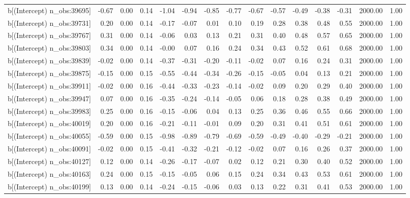 \begin{table}[ht]
\begin{tabular}{rrrrrrrrrrrrrrr}
  b[(Intercept) n\_obs:39695] & -0.67 & 0.00 & 0.14 & -1.04 & -0.94 & -0.85 & -0.77 & -0.67 & -0.57 & -0.49 & -0.38 & -0.31 & 2000.00 & 1.00 \\ 
  b[(Intercept) n\_obs:39731] & 0.20 & 0.00 & 0.14 & -0.17 & -0.07 & 0.01 & 0.10 & 0.19 & 0.28 & 0.38 & 0.48 & 0.55 & 2000.00 & 1.00 \\ 
  b[(Intercept) n\_obs:39767] & 0.31 & 0.00 & 0.14 & -0.06 & 0.03 & 0.13 & 0.21 & 0.31 & 0.40 & 0.48 & 0.57 & 0.65 & 2000.00 & 1.00 \\ 
  b[(Intercept) n\_obs:39803] & 0.34 & 0.00 & 0.14 & -0.00 & 0.07 & 0.16 & 0.24 & 0.34 & 0.43 & 0.52 & 0.61 & 0.68 & 2000.00 & 1.00 \\ 
  b[(Intercept) n\_obs:39839] & -0.02 & 0.00 & 0.14 & -0.37 & -0.31 & -0.20 & -0.11 & -0.02 & 0.07 & 0.16 & 0.24 & 0.31 & 2000.00 & 1.00 \\ 
  b[(Intercept) n\_obs:39875] & -0.15 & 0.00 & 0.15 & -0.55 & -0.44 & -0.34 & -0.26 & -0.15 & -0.05 & 0.04 & 0.13 & 0.21 & 2000.00 & 1.00 \\ 
  b[(Intercept) n\_obs:39911] & -0.02 & 0.00 & 0.16 & -0.44 & -0.33 & -0.23 & -0.14 & -0.02 & 0.09 & 0.20 & 0.29 & 0.40 & 2000.00 & 1.00 \\ 
  b[(Intercept) n\_obs:39947] & 0.07 & 0.00 & 0.16 & -0.35 & -0.24 & -0.14 & -0.05 & 0.06 & 0.18 & 0.28 & 0.38 & 0.49 & 2000.00 & 1.00 \\ 
  b[(Intercept) n\_obs:39983] & 0.25 & 0.00 & 0.16 & -0.15 & -0.06 & 0.04 & 0.13 & 0.25 & 0.36 & 0.46 & 0.55 & 0.66 & 2000.00 & 1.00 \\ 
  b[(Intercept) n\_obs:40019] & 0.20 & 0.00 & 0.16 & -0.21 & -0.11 & -0.01 & 0.09 & 0.20 & 0.31 & 0.41 & 0.51 & 0.61 & 2000.00 & 1.00 \\ 
  b[(Intercept) n\_obs:40055] & -0.59 & 0.00 & 0.15 & -0.98 & -0.89 & -0.79 & -0.69 & -0.59 & -0.49 & -0.40 & -0.29 & -0.21 & 2000.00 & 1.00 \\ 
  b[(Intercept) n\_obs:40091] & -0.02 & 0.00 & 0.15 & -0.41 & -0.32 & -0.21 & -0.12 & -0.02 & 0.07 & 0.16 & 0.26 & 0.37 & 2000.00 & 1.00 \\ 
  b[(Intercept) n\_obs:40127] & 0.12 & 0.00 & 0.14 & -0.26 & -0.17 & -0.07 & 0.02 & 0.12 & 0.21 & 0.30 & 0.40 & 0.52 & 2000.00 & 1.00 \\ 
  b[(Intercept) n\_obs:40163] & 0.24 & 0.00 & 0.15 & -0.15 & -0.05 & 0.06 & 0.15 & 0.24 & 0.34 & 0.43 & 0.53 & 0.61 & 2000.00 & 1.00 \\ 
  b[(Intercept) n\_obs:40199] & 0.13 & 0.00 & 0.14 & -0.24 & -0.15 & -0.06 & 0.03 & 0.13 & 0.22 & 0.31 & 0.41 & 0.53 & 2000.00 & 1.00 \\ 

\end{tabular}
\end{table}
